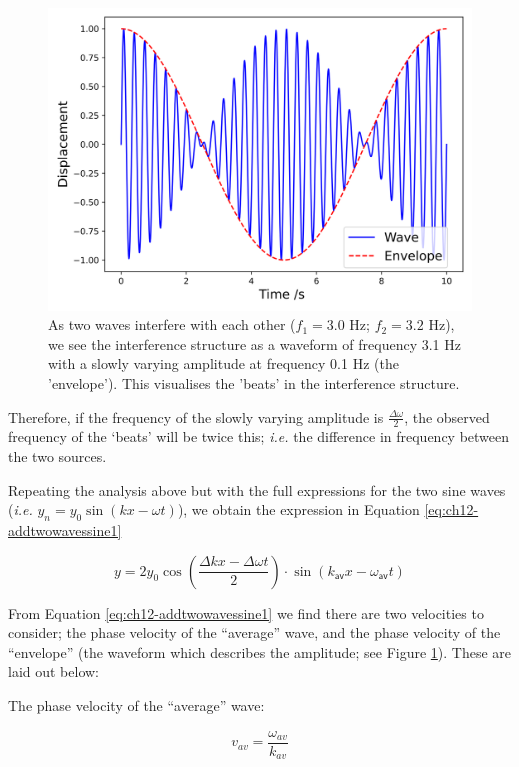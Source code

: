 \documentclass[
]{book}
\begin{document}
\begin{figure}

{\centering \includegraphics[width=0.7\linewidth]{visualisations/ch12-beats1} 

}

\caption{As two waves interfere with each other ($f_1 = 3.0$ Hz; $f_2 = 3.2$ Hz), we see the interference structure as a waveform of frequency 3.1 Hz with a slowly varying amplitude at frequency 0.1 Hz (the 'envelope'). This visualises the 'beats' in the interference structure.}\label{fig:ch12-oscillationbeats1}
\end{figure}

Therefore, if the frequency of the slowly varying amplitude is \(\frac{\Delta \omega}{2}\), the observed frequency of the `beats' will be twice this; \emph{i.e.} the difference in frequency between the two sources.

Repeating the analysis above but with the full expressions for the two sine waves (\emph{i.e.} \(y_n = y_0 \sin(kx - \omega t)\)), we obtain the expression in Equation \eqref{eq:ch12-addtwowavessine1}

\begin{equation}
y= 2 y_{0} \cos \left (\frac{\Delta kx - \Delta\omega t}{2}\right) \cdot \sin(k_\textsf{av}x - \omega_\textsf{av}t )
\label{eq:ch12-addtwowavessine1}
\end{equation}

From Equation \eqref{eq:ch12-addtwowavessine1} we find there are two velocities to consider; the phase velocity of the ``average'' wave, and the phase velocity of the ``envelope'' (the waveform which describes the amplitude; see Figure \ref{fig:ch12-oscillationbeats1}). These are laid out below:

The phase velocity of the ``average'' wave:

\begin{equation}
v_{av} = \frac{\omega_{av}}{k_{av}}
\end{equation}
\end{document}
